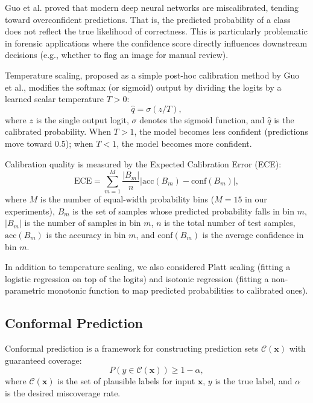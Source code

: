 Guo et al. \cite{guo2017calibration} proved that modern deep neural networks are miscalibrated, tending toward overconfident predictions. That is, the predicted probability of a class does not reflect the true likelihood of correctness. This is particularly problematic in forensic applications where the confidence score directly influences downstream decisions (e.g., whether to flag an image for manual review).

Temperature scaling, proposed as a simple post-hoc calibration method by Guo et al., modifies the softmax (or sigmoid) output by dividing the logits by a learned scalar temperature $T > 0$:
\begin{equation}
\hat{q} = \sigma(z/T),
\end{equation}
where $z$ is the single output logit, $\sigma$ denotes the sigmoid function, and $\hat{q}$ is the calibrated probability. When $T > 1$, the model becomes less confident (predictions move toward 0.5); when $T < 1$, the model becomes more confident.

Calibration quality is measured by the Expected Calibration Error (ECE):
\begin{equation}
\text{ECE} = \sum_{m=1}^{M} \frac{|B_m|}{n} \bigl|\text{acc}(B_m) - \text{conf}(B_m)\bigr|,
\label{eq:ece}
\end{equation}
where $M$ is the number of equal-width probability bins ($M{=}15$ in our experiments), $B_m$ is the set of samples whose predicted probability falls in bin $m$, $|B_m|$ is the number of samples in bin $m$, $n$ is the total number of test samples, $\text{acc}(B_m)$ is the accuracy in bin $m$, and $\text{conf}(B_m)$ is the average confidence in bin $m$.

In addition to temperature scaling, we also considered Platt scaling (fitting a logistic regression on top of the logits) and isotonic regression (fitting a non-parametric monotonic function to map predicted probabilities to calibrated ones).


\subsection{Conformal Prediction}\label{sec:conformal-related}

Conformal prediction is a framework for constructing prediction sets $\mathcal{C}(\mathbf{x})$ with guaranteed coverage:
\begin{equation}
P(y \in \mathcal{C}(\mathbf{x})) \geq 1 - \alpha,
\end{equation}
where $\mathcal{C}(\mathbf{x})$ is the set of plausible labels for input $\mathbf{x}$, $y$ is the true label, and $\alpha$ is the desired miscoverage rate.

